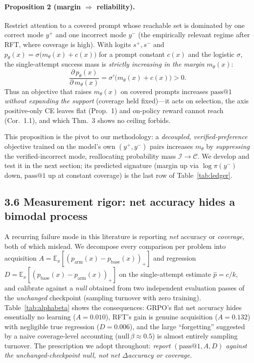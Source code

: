 \paragraph{Proposition 2 (margin $\Rightarrow$ reliability).}
Restrict attention to a covered prompt whose reachable set is dominated by one
correct mode $y^{+}$ and one incorrect mode $y^{-}$ (the empirically relevant
regime after RFT, where coverage is high). With logits $s^{+},s^{-}$ and
$p_\theta(x)=\sigma\!\big(m_\theta(x)+c(x)\big)$ for a prompt constant $c(x)$ and
the logistic $\sigma$, the single-attempt success mass is \emph{strictly
increasing in the margin} $m_\theta(x)$:
\[
\frac{\partial\, p_\theta(x)}{\partial\, m_\theta(x)}
=\sigma'\!\big(m_\theta(x)+c(x)\big)>0 .
\]
Thus an objective that raises $m_\theta(x)$ on covered prompts increases
$\text{pass}@1$ \emph{without expanding the support} (coverage held fixed)---it
acts on selection, the axis positive-only CE leaves flat (Prop.~1) and on-policy
reward cannot reach (Cor.~1.1), and which Thm.~3 shows no ceiling forbids.

This proposition is the pivot to our methodology: a \emph{decoupled,
verified-preference} objective trained on the model's own
$(y^{+}\!,y^{-})$ pairs increases $m_\theta$ by \emph{suppressing} the
verified-incorrect mode, reallocating probability mass
$\mathcal{I}\!\to\!\mathcal{C}$. We develop and test it in the next section; its
predicted signature (margin up via $\log\pi(y^{-})$ down, $\text{pass}@1$ up at
constant coverage) is the last row of Table~\ref{tab:ledger}.

\subsection*{3.6 Measurement rigor: net accuracy hides a bimodal process}

A recurring failure mode in this literature is reporting \emph{net} accuracy or
\emph{coverage}, both of which mislead. We decompose every comparison per problem
into acquisition $A=\mathbb{E}_x[(p_{\text{arm}}(x)-p_{\text{base}}(x))_{+}]$ and
regression $D=\mathbb{E}_x[(p_{\text{base}}(x)-p_{\text{arm}}(x))_{+}]$ on the
single-attempt estimate $\hat p=c/k$, and calibrate against a \emph{null} obtained
from two independent evaluation passes of the \emph{unchanged} checkpoint
(sampling turnover with zero training). Table~\ref{tab:alphabeta} shows the
consequences: GRPO's flat net accuracy hides essentially no learning
($A=0.010$), RFT's gain is genuine acquisition ($A=0.132$) with negligible true
regression ($D=0.006$), and the large ``forgetting'' suggested by a naive
coverage-level accounting ($\text{null}\,\beta\!\approx\!0.5$) is almost entirely
sampling turnover. The prescription we adopt throughout: \emph{report
$(\text{pass}@1,A,D)$ against the unchanged-checkpoint null, not net
$\Delta$accuracy or coverage.}

